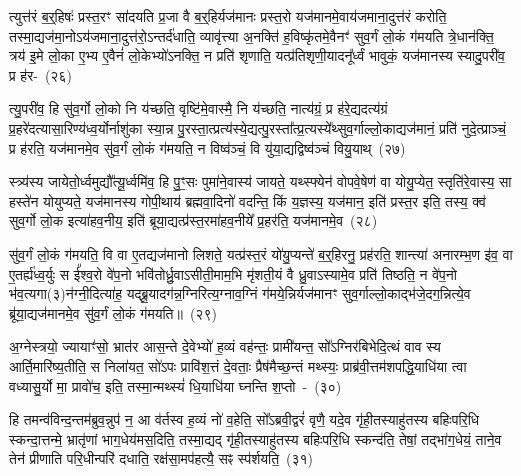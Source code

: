 त्युत्त॑रं ब॒र्॒\mbox{}हिषः॑ प्रस्त॒रꣳ सा॑दयति प्र॒जा वै ब॒र्॒\mbox{}हिर्यज॑मानः प्रस्त॒रो यज॑मानमे॒वा\-य॑जमाना॒दुत्त॑रं करोति॒ तस्मा॒द्यज॑मा॒नो\-ऽय॑जमाना॒दुत्त॑रो॒\-ऽन्तर्द॑धाति॒ व्यावृ॑त्त्या अ॒नक्ति॑ ह॒विष्कृ॑तमे॒वैनꣳ॑ सुव॒र्गं लो॒कं ग॑मयति त्रे॒धान॑क्ति॒ त्रय॑ इ॒मे लो॒का ए॒भ्य ए॒वैनं॑ लो॒केभ्यो॑\-ऽनक्ति॒ न प्रति॑ शृणाति॒ यत्प्र॑तिशृणी॒यादनू᳚र्ध्वं भावुकं॒ यज॑मानस्य स्यादु॒परी॑व॒ प्र ह॑र-~(२६)\ip

त्यु॒परी॑व॒ हि सु॑व॒र्गो लो॒को नि य॑च्छति॒ वृष्टि॑मे॒वास्मै॒ नि य॑च्छति॒ नात्य॑ग्रं॒ प्र ह॑रे॒द्यदत्य॑ग्रं प्र॒हरे॑दत्यासा॒रिण्य॑ध्व॒र्यो\-र्नाशु॑का स्या॒न्न पु॒रस्ता॒त्प्रत्य॑स्ये॒द्यत्पु॒रस्ता᳚त्प्र॒त्यस्ये᳚थ्सुव॒र्गाल्लो॒काद्यज॑\-मानं॒ प्रति॑ नुदे॒त्प्राञ्चं॒ प्र ह॑रति॒ यज॑मानमे॒व सु॑व॒र्गं लो॒कं ग॑मयति॒ न विष्व॑ञ्चं॒ वि यु॑या॒द्यद्विष्व॑ञ्चं वियु॒याथ्~(२७)\ip

स्त्र्य॑स्य जायेतो॒र्ध्वमुद्यौ᳚त्यू॒र्ध्वमि॑व॒ हि पु॒ꣳ॒सः पुमा॑ने॒वास्य॑ जायते॒ यथ्स्फ्येन॑ वोपवे॒षेण॑ वा योयु॒प्येत॒ स्तृति॑रे॒वास्य॒ सा हस्ते॑न योयुप्यते॒ यज॑मानस्य गोपी॒थाय॑ ब्रह्मवा॒दिनो॑ वदन्ति॒ किं य॒ज्ञस्य॒ यज॑मान॒ इति॑ प्रस्त॒र इति॒ तस्य॒ क्व॑ सुव॒र्गो लो॒क इत्या॑हव॒नीय॒ इति॑ ब्रूया॒द्यत्प्र॑स्त॒रमा॑हव॒नीये᳚ प्र॒हर॑ति॒ यज॑मानमे॒व~(२८)\ip

सु॑व॒र्गं लो॒कं ग॑मयति॒ वि वा ए॒तद्यज॑मानो लिशते॒ यत्प्र॑स्त॒रं यो॑यु॒प्यन्ते॑ ब॒र्॒\mbox{}हिरनु॒ प्रह॑रति॒ शान्त्या॑ अनारम्भ॒ण इ॑व॒ वा ए॒तर्\mbox{}ह्य॑ध्व॒र्युः स ई᳚श्व॒रो वे॑प॒नो भवि॑तोर्ध्रु॒वा\-ऽसीती॒माम॒भि मृ॑शती॒यं वै ध्रु॒वा\-ऽस्यामे॒व प्रति॑ तिष्ठति॒ न वे॑प॒नो भ॑व॒त्यगा(३)न॑ग्नी॒दित्या॑ह॒ यद्ब्रू॒यादग॑न्न॒ग्निरित्य॒ग्नाव॒ग्निं ग॑मये॒न्निर्यज॑मानꣳ सुव॒र्गाल्लो॒काद्भ॑जे॒द\-ग॒न्नित्ये॒व ब्रू॑या॒द्यज॑मानमे॒व सु॑व॒र्गं लो॒कं ग॑मयति॥~(२९)\ip

{\anuvakamend[{आ॒साद्य॒ प्रान॑तिदृश्ञं करोति हरति वियु॒याद्यज॑मानमे॒वाग्निरिति॑ स॒प्तद॑श च}]}

अ॒ग्नेस्त्रयो॒ ज्यायाꣳ॑सो॒ भ्रात॑र आस॒न्ते दे॒वेभ्यो॑ ह॒व्यं वह॑न्तः॒ प्रामी॑यन्त॒ सो᳚\-ऽग्निर॑बिभेदि॒त्थं वाव स्य आर्ति॒मारि॑ष्य॒तीति॒ स निला॑यत॒ सो॑\-ऽपः प्रावि॑श॒त्तं दे॒वताः॒ प्रैष॑मैच्छ॒न्तं मथ्स्यः॒ प्राब्र॑वी॒त्तम॑शपद्धि॒याधि॑या त्वा वध्यासु॒र्यो मा॒ प्रावो॑च॒ इति॒ तस्मा॒न्मथ्स्यं॑ धि॒याधि॑या घ्नन्ति श॒प्तो~-~(३०)\ip

हि तमन्व॑विन्द॒न्तम॑ब्रुव॒न्नुप॑ न॒ आ व॑र्तस्व ह॒व्यं नो॑ व॒हेति॒ सो᳚\-ऽब्रवी॒द्वरं॑ वृणै॒ यदे॒व गृ॑ही॒तस्याहु॑तस्य बहिःपरि॒धि स्कन्दा॒त्तन्मे॒ भ्रातृ॑णां भाग॒\-धेय॑मस॒दिति॒ तस्मा॒द्यद् गृ॑ही॒तस्याहु॑तस्य बहिःपरि॒धि स्कन्द॑ति॒ तेषां॒ तद्भा॑ग॒धेयं॒ ताने॒व तेन॑ प्रीणाति परि॒धीन्परि॑ दधाति॒ रक्ष॑सा॒मप॑हत्यै॒ सꣴ स्प॑र्\mbox{}शयति॒~(३१)\ip

